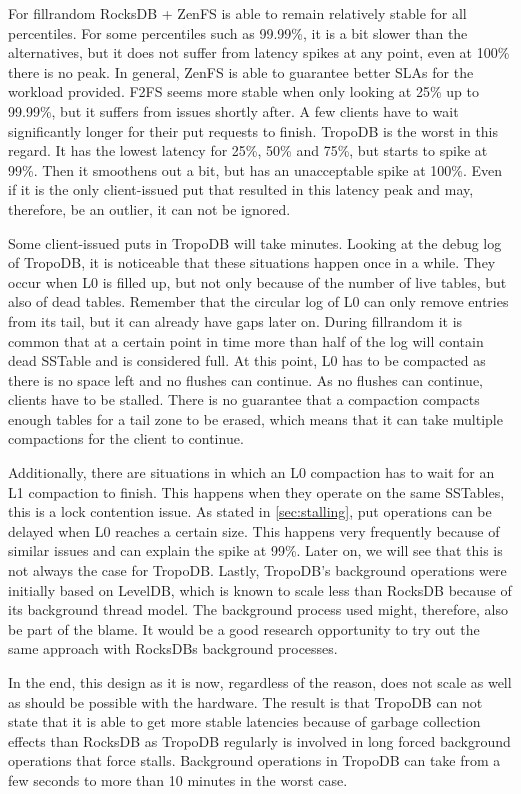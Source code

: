 For fillrandom RocksDB + ZenFS is able to remain relatively stable for all percentiles. For some percentiles such as 99.99\%, it is a bit slower than the alternatives, but it does not suffer from latency spikes at any point, even at 100\% there is no peak. In general, ZenFS is able to guarantee better SLAs for the workload provided. F2FS seems more stable when only looking at 25\% up to 99.99\%, but it suffers from issues shortly after. A few clients have to wait significantly longer for their put requests to finish. TropoDB is the worst in this regard. It has the lowest latency for 25\%, 50\% and 75\%, but starts to spike at 99\%. Then it smoothens out a bit, but has an unacceptable spike at 100\%. Even if it is the only client-issued put that resulted in this latency peak and may, therefore, be an outlier, it can not be ignored. 

Some client-issued puts in TropoDB will take minutes. Looking at the debug log of TropoDB, it is noticeable that these situations happen once in a while. They occur when L0 is filled up, but not only because of the number of live tables, but also of dead tables. Remember that the circular log of L0 can only remove entries from its tail, but it can already have gaps later on. During fillrandom it is common that at a certain point in time more than half of the log will contain dead SSTable and is considered full. At this point, L0 has to be compacted as there is no space left and no flushes can continue. As no flushes can continue, clients have to be stalled. There is no guarantee that a compaction compacts enough tables for a tail zone to be erased, which means that it can take multiple compactions for the client to continue. 

Additionally, there are situations in which an L0 compaction has to wait for an L1 compaction to finish. This happens when they operate on the same SSTables, this is a lock contention issue. As stated in \autoref{sec:stalling}, put operations can be delayed when L0 reaches a certain size. This happens very frequently because of similar issues and can explain the spike at 99\%. Later on, we will see that this is not always the case for TropoDB. Lastly, TropoDB's background operations were initially based on LevelDB, which is known to scale less than RocksDB because of its background thread model. The background process used might, therefore, also be part of the blame. It would be a good research opportunity to try out the same approach with RocksDBs background processes.

In the end, this design as it is now, regardless of the reason, does not scale as well as should be possible with the hardware. The result is that TropoDB can not state that it is able to get more stable latencies because of garbage collection effects than RocksDB as TropoDB regularly is involved in long forced background operations that force stalls. Background operations in TropoDB can take from a few seconds to more than 10 minutes in the worst case.

